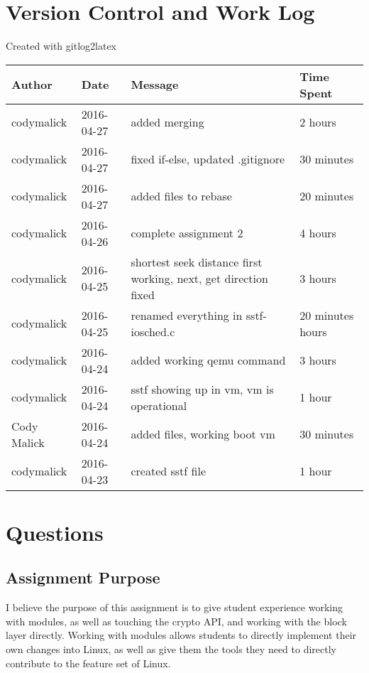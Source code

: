 \documentclass[10pt,letterpaper,onecolumn,draftclsnofoot]{IEEEtran}
\begin{document}
\section{Version Control and Work Log}
Created with gitlog2latex
\begin{center}
\begin{longtabu} to \textwidth {|
    X[4,l]|
    X[3,c]|
    X[8,l]|
    X[4,1]|}
    \hline
    \textbf{Author} & \textbf{Date} & \textbf{Message} & \textbf{Time Spent} \\ \hline
codymalick & 2016-04-27 & added merging & 2 hours \\ \hline
codymalick & 2016-04-27 & fixed if-else, updated .gitignore & 30 minutes \\ \hline
codymalick & 2016-04-27 & added files to rebase & 20 minutes \\ \hline
codymalick & 2016-04-26 & complete assignment 2 & 4 hours \\ \hline
codymalick & 2016-04-25 & shortest seek distance first working, next, get direction fixed  & 3 hours \\ \hline
codymalick & 2016-04-25 & renamed everything in sstf-iosched.c  & 20 minutes hours \\ \hline
codymalick & 2016-04-24 & added working qemu command & 3 hours \\ \hline
codymalick & 2016-04-24 & sstf showing up in vm, vm is operational & 1 hour \\ \hline
Cody Malick & 2016-04-24 & added files, working boot vm & 30 minutes \\ \hline
codymalick & 2016-04-23 & created sstf file & 1 hour \\ \hline
\end{longtabu}
\end{center}

\section{Questions}
	\subsection{Assignment Purpose}
	I believe the purpose of this assignment is to give student experience working
	with modules, as well as touching the crypto API, and working with the block
	layer directly. Working with modules allows students to directly implement
	their own changes into Linux, as well as give them the tools they need to
	directly contribute to the feature set of Linux.
\end{document}
